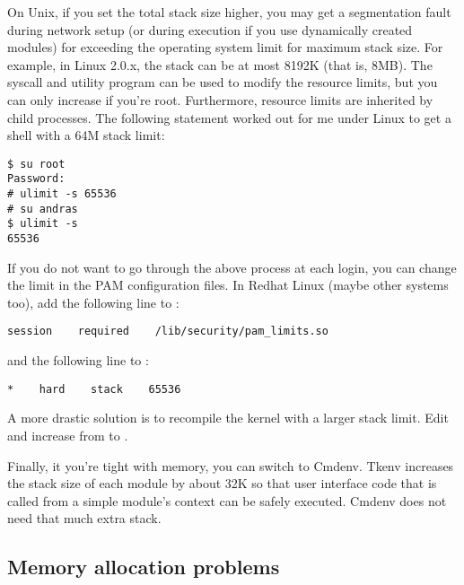 

On Unix, if you set the total stack size higher, you may get a
segmentation fault during network setup (or
during execution if you use dynamically created modules) for exceeding
the operating system limit for maximum stack size. For example, in
Linux 2.0.x, the stack can be at most 8192K (that is, 8MB). The
 syscall and utility program can be used to modify the
resource limits, but you can only increase if you're root.
Furthermore, resource limits are inherited by child processes. The
following statement worked out for me under Linux to get a shell with
a 64M stack limit:

\begin{Verbatim}
$ su root
Password:
# ulimit -s 65536
# su andras
$ ulimit -s
65536 
\end{Verbatim}

If you do not want to go through the above process at each login, you
can change the limit in the PAM configuration files. In Redhat Linux
(maybe other systems too), add the following line to
:

\begin{Verbatim}
session    required    /lib/security/pam_limits.so
\end{Verbatim}

and the following line to :

\begin{Verbatim}
*    hard    stack    65536
\end{Verbatim}

\begin{sloppypar}
A more drastic solution is to recompile the kernel with a larger stack
limit. Edit  and increase
 from  to .
\end{sloppypar}

Finally, it you're tight with memory, you can switch to Cmdenv. Tkenv
increases the stack size of each module by about 32K so that user interface code that is called from a
simple module's context can be safely executed.
Cmdenv does not need that much extra stack.




\subsection{Memory allocation problems}

